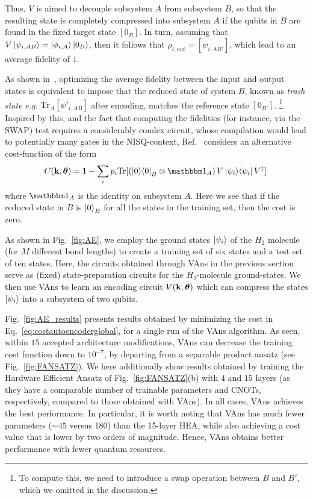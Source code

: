 Thus, $V$ is aimed to decouple subsystem $A$ from subsystem $B$, so that the resulting state is completely compressed into subsystem $A$ if the qubits in $B$ are found in the fixed target state $[0_{B}]$. In turn, assuming that $V\ket{\psi_{i,AB}} = \ket{\phi_{i,A}}\ket{0_B}$, then it follows that $\rho_{i,out} = [\psi_{i,AB'}]$, which lead to an average fidelity of $1$.

As shown in~\cite{romero2017quantum}, optimizing the average fidelity between the input and output states is equivalent to impose that the reduced state of system $B$, known as \textit{trash state} \textit{e.g.} $\text{Tr}_A [\psi'_{i,AB}]$ after encoding, matches the reference state $[0_{B'}]$. \footnote{To compute this, we need to introduce a swap operation between $B$ and $B'$, which we omitted in the discussion.}. Inspired by this, and the fact that computing the fidelities (for instance, via the SWAP) test requires a considerably comlex circuit, whose compilation would lead to potentially many gates in the NISQ-context, Ref.~\cite{romero2017quantum} considers an alternative cost-function of the form
\begin{equation}\label{eq:costautoencoderglobal}
    C(\kvec,\thv)=1-\sum_ip_i\tr{\left(\dya{0}_B\otimes \id_A\right)V\dya{\psi_i}V^\dagger}\,
\end{equation}
where $\id_A$ is the identity on subsystem $A$. Here we see that if the reduced state in $B$ is $\ket{0}_B$ for all the states in the training set, then the cost is zero.

As shown in Fig.~\ref{fig:AE}, we employ the ground states $\ket{\psi_i}$ of the $H_2$ molecule (for $M$ different bond lengths) to create a training set of six states and a test set of ten states. Here, the circuits obtained through VAns in the previous section serve as (fixed) state-preparation circuits for the $H_2$-molecule ground-states. We then use VAns to learn an encoding circuit $V(\mathbf{k}, \bm{\theta})$ which can compress the states $\ket{\psi_i}$ into a subsystem of two qubits.

Fig.~\ref{fig:AE_results} presents results obtained by minimizing the cost in Eq.~\ref{eq:costautoencoderglobal}, for a single run of the VAns algorithm. As seen, within $15$ accepted architecture modifications, VAns can decrease the training cost function down to $10^{-7}$, by departing from a separable product ansatz (see Fig.~\ref{fig:FANSATZ}). We here additionally show results obtained by training the Hardware Efficient Ansatz of Fig.~\ref{fig:FANSATZ}(b) with $4$ and $15$ layers
(as they have a comparable number of trainable parameters and CNOTs, respectively, compared to those obtained with VAns). In all cases, VAns achieves the best performance. In particular, it is worth noting that VAns has much fewer parameters
($\sim 45$ versus 180) than the 15-layer HEA, while also achieving a cost value that is lower by two orders of magnitude. Hence, VAns obtains better performance with fewer quantum resources.

